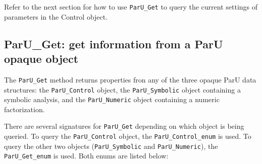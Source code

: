 \documentclass[12pt]{article}
\begin{document}
Refer to the next section for how to use \verb'ParU_Get' to query
the current settings of parameters in the Control object.

\subsection{{\sf ParU\_Get}: get information from a ParU opaque object}
\label{get}

The \verb'ParU_Get' method returns properties fron any of the three opaque ParU
data structures: the \verb'ParU_Control' object, the \verb'ParU_Symbolic'
object containing a symbolic analysis, and the \verb'ParU_Numeric' object
containing a numeric factorization.

There are several signatures for \verb'ParU_Get' depending on which
object is being queried.  To query the \verb'ParU_Control' object,
the \verb'ParU_Control_enum' is used.  To query the other two objects
(\verb'ParU_Symbolic' and  \verb'ParU_Numeric'), the 
\verb'ParU_Get_enum' is used.  Both enums are listed below:
\end{document}
